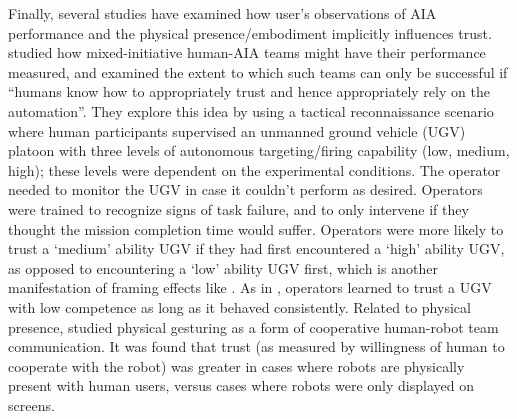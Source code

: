 Finally, several studies have examined how user's observations of AIA performance and the physical presence/embodiment implicitly influences trust. %
\citet{Freedy2007-sg} studied how mixed-initiative human-AIA teams might have their performance measured, and examined the extent to which such teams can only be successful if ``humans know how to appropriately trust and hence appropriately rely on the automation''. 
They explore this idea by using a tactical reconnaissance scenario where human participants supervised an unmanned ground vehicle (UGV)  platoon with three levels of autonomous targeting/firing capability (low, medium, high); these levels were dependent on the experimental conditions. The operator needed to monitor the UGV in case it couldn't perform as desired.
Operators were trained to recognize signs of task failure, and to only intervene if they thought the mission completion time would suffer. %
Operators were more likely to trust a `medium' ability UGV if they had first encountered a `high' ability UGV, as opposed to encountering a `low' ability UGV first, which is another manifestation of framing effects like \cite{Riley1996-qm}. %
As in \cite{Muir1996-gt}, operators learned to trust a UGV with low competence as long as it behaved consistently. 
Related to physical presence, \citet{Bainbridge2011-pl} studied physical gesturing as a form of cooperative human-robot team communication.  It was found that trust (as measured by willingness of human to cooperate with the robot) was greater in cases where robots are physically present with human users, versus cases where robots were only displayed on screens. 
